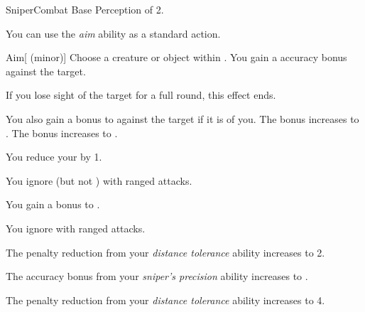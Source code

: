     \begin{feat}{Sniper}{Combat}
        \featpre Base Perception of 2.

         You can use the \textit{aim} ability as a standard action.
        \begin{freeability}{Aim}[ (minor)]
            Choose a creature or object within .
            You gain a  accuracy bonus against the target.

            If you lose sight of the target for a full round, this effect ends.

            \rankline
             You also gain a  bonus to  against the target if it is \unaware of you.
             The  bonus increases to .
             The  bonus increases to .
        \end{freeability}

         You reduce your  by 1.

         You ignore  (but not ) with ranged attacks.

         You gain a  bonus to .

         You ignore  with ranged attacks.

         The penalty reduction from your \textit{distance tolerance} ability increases to 2.

         The accuracy bonus from your \textit{sniper's precision} ability increases to .

         The penalty reduction from your \textit{distance tolerance} ability increases to 4.
    \end{feat}

